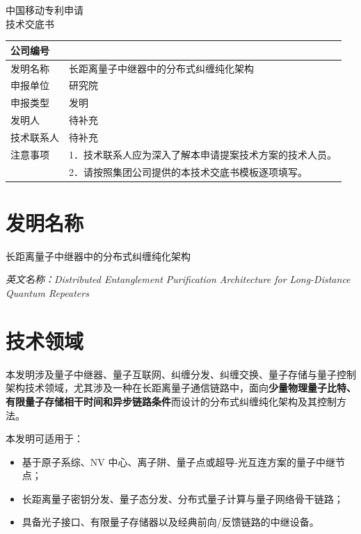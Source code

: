\documentclass[12pt,a4paper]{article}
\begin{document}
\begin{center}
    {\Large\heiti 中国移动专利申请} \\[1em]
    {\Huge\heiti 技术交底书} \\[1em]
\end{center}

\noindent
{
\begin{tabular}{|L{2.8cm}|L{11.8cm}|}
\hline
公司编号 &  \\
\hline
发明名称 & 长距离量子中继器中的分布式纠缠纯化架构 \\
\hline
申报单位 & 研究院 \\
\hline
申报类型 & 发明 \\
\hline
发明人 & 待补充 \\
\hline
技术联系人 & 待补充 \\
\hline
注意事项 & 1．技术联系人应为深入了解本申请提案技术方案的技术人员。 \\
         & 2．请按照集团公司提供的本技术交底书模板逐项填写。 \\
\hline
\end{tabular}
}

\vspace{1cm}

\section{发明名称}

长距离量子中继器中的分布式纠缠纯化架构

\textit{英文名称：Distributed Entanglement Purification Architecture for Long-Distance Quantum Repeaters}

\section{技术领域}

本发明涉及量子中继器、量子互联网、纠缠分发、纠缠交换、量子存储与量子控制架构技术领域，尤其涉及一种在长距离量子通信链路中，面向\textbf{少量物理量子比特、有限量子存储相干时间和异步链路条件}而设计的分布式纠缠纯化架构及其控制方法。

本发明可适用于：
\begin{itemize}[noitemsep]
    \item 基于原子系综、NV 中心、离子阱、量子点或超导-光互连方案的量子中继节点；
    \item 长距离量子密钥分发、量子态分发、分布式量子计算与量子网络骨干链路；
    \item 具备光子接口、有限量子存储器以及经典前向/反馈链路的中继设备。
\end{itemize}
\end{document}
